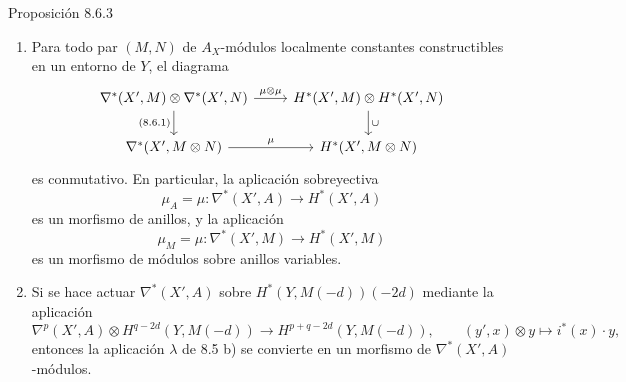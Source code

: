 \begin{statement}{Proposición 8.6.3}
\begin{enumerate}[label=\alph*)]
\item Para todo par $(M,N)$ de $A_X$-módulos localmente constantes constructibles en un entorno de $Y$, el diagrama
\[
\begin{tikzcd}
\nabla^*(X',M)\otimes\nabla^*(X',N)\arrow[r,"\mu\otimes\mu"]\arrow[d,"{(8.6.1)}"']&
H^*(X',M)\otimes H^*(X',N)\arrow[d,"\cup"]\\
\nabla^*(X',M\otimes N)\arrow[r,"\mu"]&
H^*(X',M\otimes N)
\end{tikzcd}
\]
es conmutativo. En particular, la aplicación sobreyectiva
\[
\mu_A=\mu:\nabla^*(X',A)\to H^*(X',A)
\]
es un morfismo de anillos, y la aplicación
\[
\mu_M=\mu:\nabla^*(X',M)\to H^*(X',M)
\]
es un morfismo de módulos sobre anillos variables.
\item Si se hace actuar $\nabla^*(X',A)$ sobre $H^*(Y,M(-d))(-2d)$ mediante la aplicación
\[
\nabla^p(X',A)\otimes H^{q-2d}(Y,M(-d))
\to H^{p+q-2d}(Y,M(-d)),
\qquad
(y',x)\otimes y\mapsto i^*(x)\cdot y,
\]
entonces la aplicación $\lambda$ de 8.5 b) se convierte en un morfismo de $\nabla^*(X',A)$-módulos.
\end{enumerate}
\end{statement}
